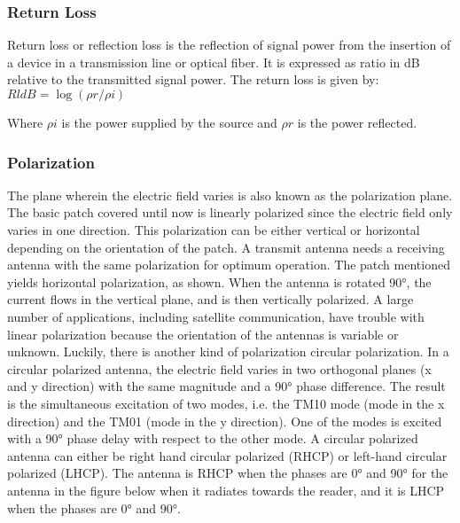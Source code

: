 \documentclass[12pt]{article}
\begin{document}
        \subsubsection{Return Loss}\label{Return Loss}
		 \justify
          Return loss or reflection loss is the reflection of signal power from the insertion of a device in a transmission line or optical fiber. It is expressed as ratio in dB relative to the transmitted signal power. 
          The return loss is given by: \newline \newline
          $RldB = \log⁡(\rho {r} / \rho i)$

	      Where $\rho i $  is the power supplied by the source and $\rho r $ is the power reflected.
         

          \subsubsection{Polarization}\label{sub:Polarization}
           \justify
            The plane wherein the electric field varies is also known as the polarization plane. The
            basic patch covered until now is linearly polarized since the electric field only varies in one
            direction. This polarization can be either vertical or horizontal depending on the orientation of the patch. A transmit antenna needs a receiving antenna with the same polarization for optimum operation. The patch mentioned yields horizontal polarization, as shown. When the antenna is rotated 90°, the current flows in the vertical plane, and is then vertically polarized. A large number of applications, including satellite communication, have trouble with linear polarization because the orientation of the antennas is variable or unknown. Luckily, there is another kind of polarization circular polarization. In a circular polarized antenna, the electric field varies in two orthogonal planes (x and y direction) with the same magnitude and a 90° phase difference. The result is the simultaneous excitation of two modes, i.e. the TM10 mode (mode in the x direction) and the TM01 (mode in the y direction). One of the modes is excited with a 90° phase delay with respect to the other mode. A circular polarized antenna can either be right hand circular polarized (RHCP) or left-hand circular polarized (LHCP). The antenna is RHCP when the phases are 0° and 90° for the antenna in the figure below when it radiates towards the reader, and it is LHCP when the phases are 0° and 90°.
\end{document}
